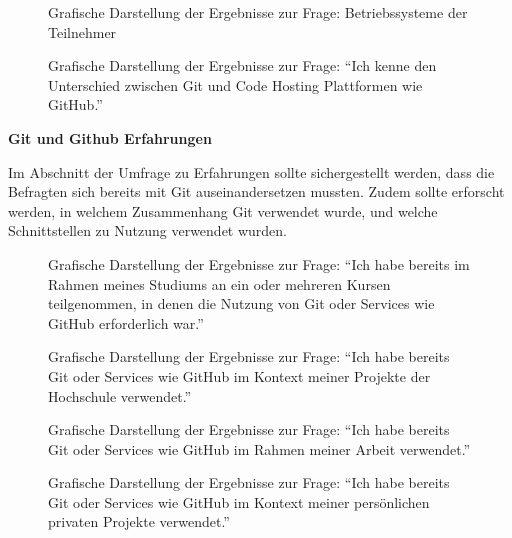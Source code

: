 \documentclass[
	ngerman,
	BCOR=8mm,
	headings=normal,
	parskip=half,
	headsepline,
	automark,
	listof=totoc,
	bibliography=totoc,
]{scrreprt}
\begin{document}
\begin{figure}[h!]
    \centering
    
    \caption{Grafische Darstellung der Ergebnisse zur Frage: Betriebssysteme der Teilnehmer}
\end{figure}

\begin{figure}[h!]
    \centering
    
    \caption{Grafische Darstellung der Ergebnisse zur Frage: ``Ich kenne den Unterschied zwischen Git und Code Hosting Plattformen wie GitHub.''}
\end{figure}

\newpage
{\LARGE \textbf{Git und Github Erfahrungen}}

Im Abschnitt der Umfrage zu Erfahrungen sollte sichergestellt werden, dass die Befragten sich bereits mit Git auseinandersetzen mussten.
Zudem sollte erforscht werden, in welchem Zusammenhang Git verwendet wurde, und welche Schnittstellen zu Nutzung verwendet wurden.

\begin{figure}[h!]
    \centering
    
    \caption{Grafische Darstellung der Ergebnisse zur Frage: ``Ich habe bereits im Rahmen meines Studiums an ein oder mehreren Kursen teilgenommen, in denen die Nutzung von Git oder Services wie GitHub erforderlich war.''}
\end{figure}

\begin{figure}[h!]
    \centering
    
    \caption{Grafische Darstellung der Ergebnisse zur Frage: ``Ich habe bereits Git oder Services wie GitHub im Kontext meiner Projekte der Hochschule verwendet.''}
\end{figure}

\begin{figure}[h!]
    \centering
    
    \caption{Grafische Darstellung der Ergebnisse zur Frage: ``Ich habe bereits Git oder Services wie GitHub im Rahmen meiner Arbeit verwendet.''}
\end{figure}

\begin{figure}[h!]
    \centering
    
    \caption{Grafische Darstellung der Ergebnisse zur Frage: ``Ich habe bereits Git oder Services wie GitHub im Kontext meiner persönlichen privaten Projekte verwendet.''}
\end{figure}
\end{document}
